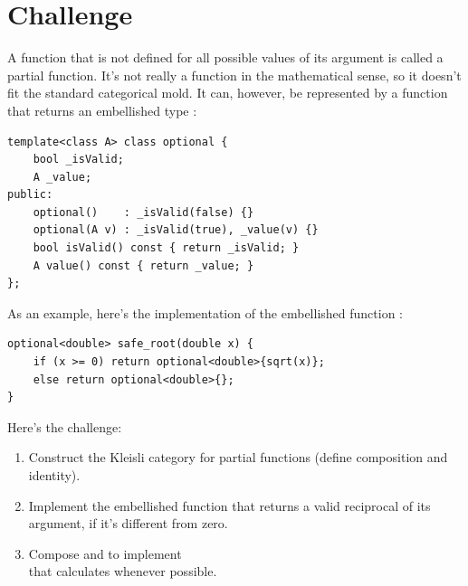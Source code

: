 \section{Challenge}\label{challenge}

A function that is not defined for all possible values of its argument
is called a partial function. It's not really a function in the
mathematical sense, so it doesn't fit the standard categorical mold. It
can, however, be represented by a function that returns an embellished
type :

\begin{Verbatim}[commandchars=\\\{\}]
template<class A> class optional {
    bool _isValid;
    A _value;
public: 
    optional()    : _isValid(false) {}
    optional(A v) : _isValid(true), _value(v) {}
    bool isValid() const { return _isValid; }
    A value() const { return _value; }
};
\end{Verbatim}
As an example, here's the implementation of the embellished function
:

\begin{Verbatim}[commandchars=\\\{\}]
optional<double> safe_root(double x) {
    if (x >= 0) return optional<double>{sqrt(x)}; 
    else return optional<double>{};
}
\end{Verbatim}
Here's the challenge:

\begin{enumerate}
\tightlist
\item
  Construct the Kleisli category for partial functions (define
  composition and identity).
\item
  Implement the embellished function  that
  returns a valid reciprocal of its argument, if it's different from
  zero.
\item
  Compose  and  to implement\\
   that calculates 
  whenever possible.
\end{enumerate}